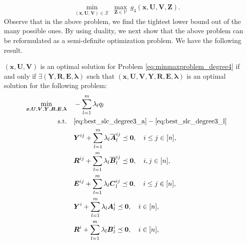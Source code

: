 \documentclass[opre,nonblindrev]{informs3} %
\begin{document}
{\begin{equation}
       \min_{\left(\boldsymbol{x},\boldsymbol{U},\boldsymbol{V}\right) \in \overline{\mathcal{X}} } \: \max_{\boldsymbol{Z} \in \mathcal{V}} \: g_4(\boldsymbol{x},\boldsymbol{U},\boldsymbol{V},\boldsymbol{Z}). \label{eq:minmaxproblem_degree4}
\end{equation} 
Observe that in the above problem, we find the tightest lower bound out of the many possible ones. By using duality, we next show that the above problem can be reformulated as a semi-definite optimization problem.} We have the following result.
\begin{theorem}
\label{thm:reformulation_degree4}
   {\color{black} $\left(\boldsymbol{x},\boldsymbol{U},\boldsymbol{V}\right)$ is an optimal solution for Problem \eqref{eq:minmaxproblem_degree4} if and only if $\exists \left( \boldsymbol{Y}, \boldsymbol{R}, \boldsymbol{E}, \boldsymbol{\lambda} \right)$ such that $\left(\boldsymbol{x},\boldsymbol{U},\boldsymbol{V},\boldsymbol{Y},\boldsymbol{R},\boldsymbol{E},\boldsymbol{\lambda}\right)$ is an optimal solution for the following problem:}
   \begin{subequations}
   \begin{align}
  \displaystyle \min_{\boldsymbol{x}, \boldsymbol{U}, \boldsymbol{V}, \boldsymbol{Y}, \boldsymbol{R}, \boldsymbol{E}, \boldsymbol{\lambda}} &\quad - \sum_{l=1}^{m} \lambda_l q_l \nonumber \\
     {\rm s.t.} &\quad \eqref{eq:best_slc_degree3_a} - \eqref{eq:best_slc_degree3_l} \nonumber \\ 
        &\quad \boldsymbol{Y}^{ij} + \sum_{l=1}^{m} \lambda_l \overline{\boldsymbol{A}}_l^{ij} \preceq \boldsymbol{0}, \quad i \le j \in [n], \label{eq:best_slc_degree4_a}  \\
        &\quad  \boldsymbol{R}^{ij} + \sum_{l=1}^{m} \lambda_l \overline{\boldsymbol{B}}_l^{ij} \preceq \boldsymbol{0}, \quad i,j \in [n], \label{eq:best_slc_degree4_b}  \\
        &\quad  \boldsymbol{E}^{ij} + \sum_{l=1}^{m} \lambda_l \boldsymbol{C}_l^{ij} \preceq \boldsymbol{0}, \quad i \le j \in [n], \label{eq:best_slc_degree4_c} \\ 
        &\quad \boldsymbol{Y}^{i} + \sum_{l=1}^{m} \lambda_l \boldsymbol{A}_l^{i} \preceq \boldsymbol{0}, \quad i \in [n], \label{eq:best_slc_degree4_d} \\
        &\quad \boldsymbol{R}^{i} + \sum_{l=1}^{m} \lambda_l \boldsymbol{B}_l^{i} \preceq \boldsymbol{0}, \quad i \in [n], \label{eq:best_slc_degree4_e} \\ 

\end{align}
\end{subequations}
\end{theorem}
\end{document}
